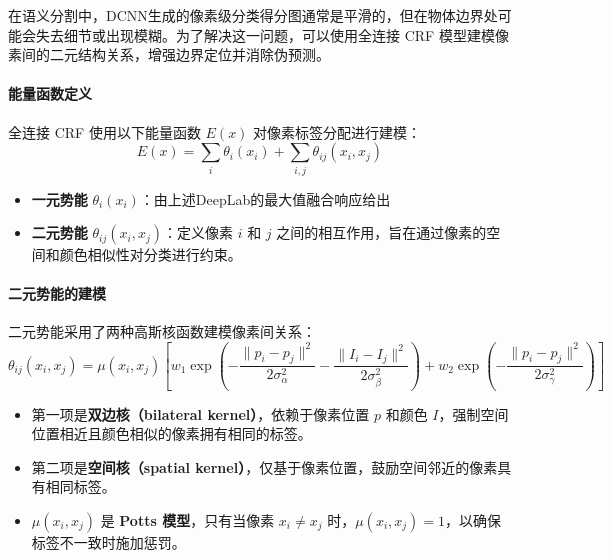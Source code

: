 \documentclass[a4paper,12pt]{ctexart}
\begin{document}
在语义分割中，DCNN生成的像素级分类得分图通常是平滑的，但在物体边界处可能会失去细节或出现模糊。为了解决这一问题，可以使用全连接 CRF 模型建模像素间的二元结构关系，增强边界定位并消除伪预测。

\paragraph{能量函数定义}
    全连接 CRF 使用以下能量函数 $E(x)$ 对像素标签分配进行建模：
    $$
    E(x) = \sum_{i} \theta_i(x_i) + \sum_{i,j} \theta_{ij}(x_i, x_j)
    $$
    \begin{itemize}
        \item \textbf{一元势能} $\theta_i(x_i)$：由上述DeepLab的最大值融合响应给出
        \item \textbf{二元势能} $\theta_{ij}(x_i, x_j)$：定义像素 $i$ 和 $j$ 之间的相互作用，旨在通过像素的空间和颜色相似性对分类进行约束。     
    \end{itemize}

\paragraph{二元势能的建模}
    二元势能采用了两种高斯核函数建模像素间关系：
    $$
    \theta_{ij}(x_i, x_j) = \mu(x_i, x_j) \left[ w_1 \exp \left( -\frac{\|p_i - p_j\|^2}{2\sigma_\alpha^2} - \frac{\|I_i - I_j\|^2}{2\sigma_\beta^2} \right) + w_2 \exp \left( -\frac{\|p_i - p_j\|^2}{2\sigma_\gamma^2} \right) \right]
    $$
    \begin{itemize}
    \item 第一项是\textbf{双边核（bilateral kernel）}，依赖于像素位置 $p$ 和颜色 $I$，强制空间位置相近且颜色相似的像素拥有相同的标签。
    \item 第二项是\textbf{空间核（spatial kernel）}，仅基于像素位置，鼓励空间邻近的像素具有相同标签。
    \item $\mu(x_i, x_j)$ 是 \textbf{Potts 模型}，只有当像素 $x_i \neq x_j$ 时，$\mu(x_i, x_j) = 1$，以确保标签不一致时施加惩罚。
    \end{itemize}
\end{document}
